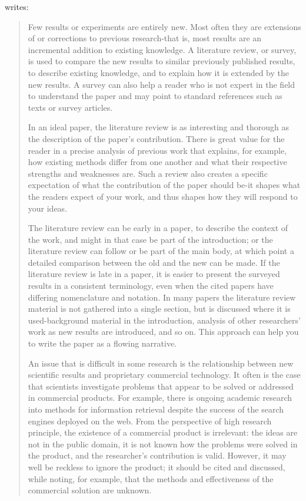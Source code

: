\documentclass[a4paper,oneside,bibliography=totoc]{scrbook}
\begin{document}
\citet{zobel2004} writes:

\blockcquote{zobel2004}{%
  Few results or experiments are entirely new. Most often they are extensions of
  or corrections to previous research-that is, most results are an incremental
  addition to existing knowledge. A literature review, or survey, is used to
  compare the new results to similar previously published results, to describe
  existing knowledge, and to explain how it is extended by the new results. A
  survey can also help a reader who is not expert in the field to understand the
  paper and may point to standard references such as texts or survey articles.

  In an ideal paper, the literature review is as interesting and thorough as the
  description of the paper's contribution. There is great value for the reader
  in a precise analysis of previous work that explains, for example, how
  existing methods differ from one another and what their respective strengths
  and weaknesses are. Such a review also creates a specific expectation of what
  the contribution of the paper should be-it shapes what the readers expect of
  your work, and thus shapes how they will respond to your ideas.

  The literature review can be early in a paper, to describe the context of the
  work, and might in that case be part of the introduction; or the literature
  review can follow or be part of the main body, at which point a detailed
  comparison between the old and the new can be made. If the literature review
  is late in a paper, it is easier to present the surveyed results in a
  consistent terminology, even when the cited papers have differing nomenclature
  and notation. In many papers the literature review material is not gathered
  into a single section, but is discussed where it is used-background material
  in the introduction, analysis of other researchers' work as new results are
  introduced, and so on. This approach can help you to write the paper as a
  flowing narrative.

  An issue that is difficult in some research is the relationship between new
  scientific results and proprietary commercial technology. It often is the case
  that scientists investigate problems that appear to be solved or addressed in
  commercial products. For example, there is ongoing academic research into
  methods for information retrieval despite the success of the search engines
  deployed on the web. From the perspective of high research principle, the
  existence of a commercial product is irrelevant: the ideas are not in the
  public domain, it is not known how the problems were solved in the product,
  and the researcher's contribution is valid. However, it may well be reckless
  to ignore the product; it should be cited and discussed, while noting, for
  example, that the methods and effectiveness of the commercial solution are
  unknown. }
\end{document}
